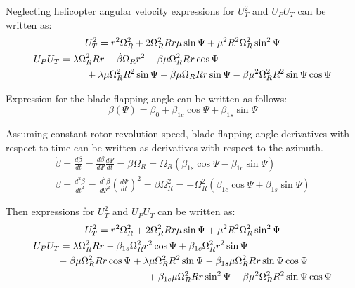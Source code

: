 Neglecting helicopter angular velocity expressions for $U_T^2$ and $U_P U_T$ can be written as:
\begin{gather}
  \label{eq-aero-u-t-sq}
  U_T^2 =
  r^2 \Omega_R^2 + 2 \Omega_R^2 R r \mu \sin \Psi
  + \mu^2 R^2 \Omega_R^2 \sin^2 \Psi \\
  \label{eq-aero-u-p-u-t}
  \begin{multlined}[0.88\textwidth]
  U_P U_T =
  \lambda \Omega_R^2 R r - \dot \beta \Omega_R r^2
  - \beta \mu \Omega_R^2 R r \cos \Psi \\
  + \lambda \mu \Omega_R^2 R^2 \sin \Psi
  - \dot \beta \mu \Omega_R R r \sin \Psi
  - \beta \mu^2 \Omega_R^2 R^2 \sin \Psi \cos \Psi
  \end{multlined}
\end{gather}

Expression for the blade flapping angle can be written as follows: \cite{Padfield2007, GessowMyers1985, NASA-TT-F-494}
\begin{equation}
  \label{eq-aero-blade-flapping-angle}
  \beta \left( \Psi \right) = 
  \beta_0 + \beta_{1c} \cos \Psi + \beta_{1s} \sin \Psi
\end{equation}

Assuming constant rotor revolution speed, blade flapping angle derivatives with respect to time can be written as derivatives with respect to the azimuth. \cite{GessowMyers1985}
\begin{gather}
  \dot \beta = \frac{d\beta}{dt}
  = \frac{d\beta}{d\Psi} \frac{d\Psi}{dt} =
  \bar \beta \Omega_R =
  \Omega_R
  \left( \beta_{1s} \cos \Psi - \beta_{1c} \sin \Psi \right) \\
  \ddot \beta = \frac{d^2\beta}{dt^2}
  = \frac{d^2\beta}{d\Psi^2} \left( \frac{d\Psi}{dt} \right)^2 = 
  \bar{\bar \beta} \Omega_R^2
  =
  -\Omega_R^2
  \left( \beta_{1c} \cos \Psi + \beta_{1s} \sin \Psi \right)
\end{gather}

Then expressions for $U_T^2$ and $U_P U_T$ can be written as:
\begin{gather}
  U_T^2 = r^2 \Omega_R^2 + 2 \Omega_R^2 R r \mu \sin \Psi
  + \mu^2 R^2 \Omega_R^2 \sin^2 \Psi \\
  \begin{multlined}[0.88\textwidth]
    U_P U_T = \lambda \Omega_R^2 R r
    - \beta_{1s} \Omega_R^2 r^2 \cos \Psi
    + \beta_{1c} \Omega_R^2 r^2 \sin \Psi \\
    - \beta \mu \Omega_R^2 R r \cos \Psi
    + \lambda \mu \Omega_R^2 R^2 \sin \Psi
    - \beta_{1s} \mu \Omega_R^2 R r \sin \Psi \cos \Psi \\
    + \beta_{1c} \mu \Omega_R^2 R r \sin^2 \Psi
    - \beta \mu^2 \Omega_R^2 R^2 \sin \Psi \cos \Psi
  \end{multlined}
\end{gather}

